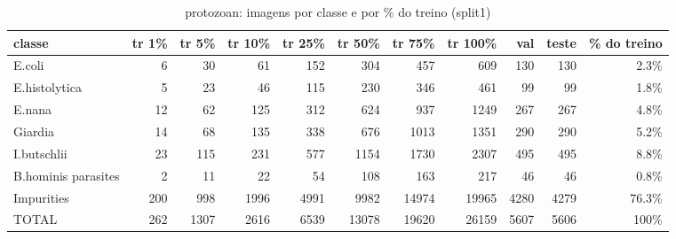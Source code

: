 \begin{table}[h]\centering\small
\caption{protozoan: imagens por classe e por \% do treino (split1)}
\begin{tabular}{lrrrrrrrrrr}\toprule
classe & tr 1\% & tr 5\% & tr 10\% & tr 25\% & tr 50\% & tr 75\% & tr 100\% & val & teste & \% do treino \\\midrule
E.coli & 6 & 30 & 61 & 152 & 304 & 457 & 609 & 130 & 130 & 2.3\% \\
E.histolytica & 5 & 23 & 46 & 115 & 230 & 346 & 461 & 99 & 99 & 1.8\% \\
E.nana & 12 & 62 & 125 & 312 & 624 & 937 & 1249 & 267 & 267 & 4.8\% \\
Giardia & 14 & 68 & 135 & 338 & 676 & 1013 & 1351 & 290 & 290 & 5.2\% \\
I.butschlii & 23 & 115 & 231 & 577 & 1154 & 1730 & 2307 & 495 & 495 & 8.8\% \\
B.hominis parasites & 2 & 11 & 22 & 54 & 108 & 163 & 217 & 46 & 46 & 0.8\% \\
Impurities & 200 & 998 & 1996 & 4991 & 9982 & 14974 & 19965 & 4280 & 4279 & 76.3\% \\
\midrule TOTAL & 262 & 1307 & 2616 & 6539 & 13078 & 19620 & 26159 & 5607 & 5606 & 100\% \\\bottomrule
\end{tabular}\end{table}
